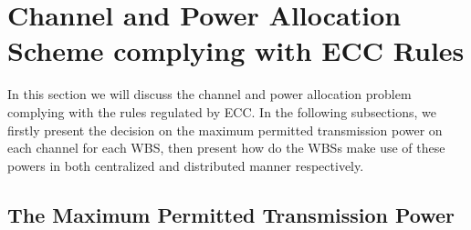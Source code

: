 \documentclass[times]{ettauth}
\theoremstyle{mytheoremstyle}
\theoremstyle{mytheoremstyle}
\theoremstyle{mytheoremstyle}
\begin{document}


%
%

\section{Channel and Power Allocation Scheme complying with ECC Rules}

In this section we will discuss the channel and power allocation problem complying with the rules regulated by ECC.
In the following subsections, we firstly present the decision on the maximum permitted transmission power on each channel for each WBS, then present how do the WBSs make use of these powers in both centralized and distributed manner respectively.
\subsection{The Maximum Permitted Transmission Power}
\label{powermap}
\end{document}
